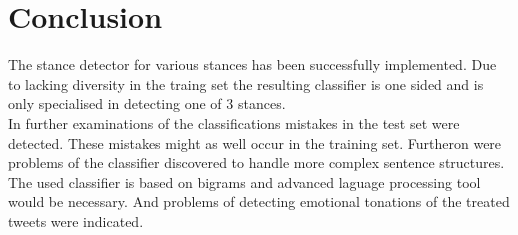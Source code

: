\documentclass[a4paper,12pt,twoside]{article}
\begin{document}
\section{Conclusion}
The stance detector for various stances has been successfully implemented. Due to lacking diversity in the traing set the resulting classifier is one sided and is only specialised in detecting one of 3 stances.\\
In further examinations of the classifications mistakes in the test set were detected. These mistakes might as well occur in the training set. Furtheron were problems of the classifier discovered to handle more complex sentence structures. The used classifier is based on bigrams and advanced laguage processing tool would be necessary. And problems of detecting emotional tonations of the treated tweets were indicated.\\


 
\end{document}
